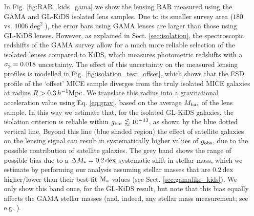 \documentclass[usenatbib]{mnras}
\newcommand{\hMpc}{\, h^{-1}{\rm{Mpc}} }
\newcommand{\un}[1]{_{\rm #1}}
\newcommand{\dex}{\, {\rm dex}}
\begin{document}
In Fig. \ref{fig:RAR_kids_gama} we show the lensing RAR measured using the GAMA and GL-KiDS isolated lens samples. Due to its smaller survey area ($180$ vs. $1006 \deg^2$), the error bars using GAMA lenses are larger than those using GL-KiDS lenses. However, as explained in Sect. \ref{sec:isolation}, the spectroscopic redshifts of the GAMA survey allow for a much more reliable selection of the isolated lenses compared to KiDS, which measures photometric redshifts with a $\sigma\un{z}=0.018$ uncertainty. The effect of this uncertainty on the measured lensing profiles is modelled in Fig. \ref{fig:isolation_test_offset}, which shows that the ESD profile of the `offset' MICE sample diverges from the truly isolated MICE galaxies at radius $R > 0.3 \hMpc$. We translate this radius into a gravitational acceleration value using Eq. \ref{eq:grav}, based on the average $M\un{bar}$ of the lens sample. In this way we estimate that, for the isolated GL-KiDS galaxies, the isolation criterion is reliable within $g\un{bar} \lessapprox 10^{-13}$, as shown by the blue dotted vertical line. Beyond this line (blue shaded region) the effect of satellite galaxies on the lensing signal can result in systematically higher values of $g\un{obs}$, due to the possible contribution of satellite galaxies. The grey band shows the range of possible bias due to a $\Delta M_*=0.2 \dex$ systematic shift in stellar mass, which we estimate by performing our analysis assuming stellar masses that are $0.2 \dex$ higher/lower than their best-fit ${\rm M_*}$ values (see Sect. \ref{sec:gamalike_kids}). We only show this band once, for the GL-KiDS result, but note that this bias equally affects the GAMA stellar masses (and, indeed, any stellar mass measurement; see e.g. \citealt{wright2017}).
\end{document}
